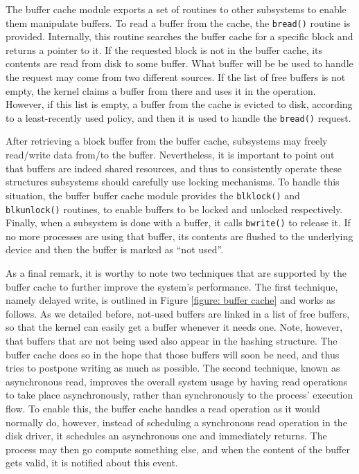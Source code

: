 \documentclass[10pt,a4paper]{article}
\begin{document}
The buffer cache module exports a set of routines to other subsystems to enable them manipulate buffers. To read a buffer from the cache, the \texttt{bread()} routine is provided. Internally, this routine searches the buffer cache for a specific block and returns a pointer to it. If the requested block is not in the buffer cache, its contents are read from disk to some buffer. What buffer will be be used to handle the request may come from two different sources. If the list of free buffers is not empty, the kernel claims a buffer from there and uses it in the operation. However, if this list is empty, a buffer from the cache is evicted to disk, according to a least-recently used policy, and then it is used to handle the \texttt{bread()} request.

After retrieving a block buffer from the buffer cache, subsystems may freely read/write data from/to the buffer. Nevertheless, it is important to point out that buffers are indeed shared resources, and thus to consistently operate these structures subsystems should carefully use locking mechanisms. To handle this situation, the buffer  buffer cache module provides the \texttt{blklock()} and \texttt{blkunlock()} routines, to enable buffers to be locked and unlocked respectively. Finally, when a subsystem is done with a buffer, it calls \texttt{bwrite()} to release it. If no more processes are using that buffer, its contents are flushed to the underlying device and then the buffer is marked as ``not used''.

As a final remark, it is worthy to note two techniques that are supported by the buffer cache to further improve the system's performance. The first technique, namely delayed write, is outlined in Figure \ref{figure: buffer cache} and works as follows. As we detailed before, not-used buffers are linked in a list of free buffers, so that the kernel can easily get a buffer whenever it needs one. Note, however, that buffers that are not being used also appear in the hashing structure. The buffer cache does so in the hope that those buffers will soon be need, and thus tries to postpone writing as much as possible. The second technique, known as asynchronous read, improves the overall system usage by having read operations to take place asynchronously, rather than synchronously to the process' execution flow. To enable this, the buffer cache handles a read operation as it would normally do, however, instead of scheduling a synchronous read operation in the disk driver, it schedules an asynchronous one and immediately returns. The process may then go compute something else, and when the content of the buffer gets valid, it is notified about this event.
\end{document}

